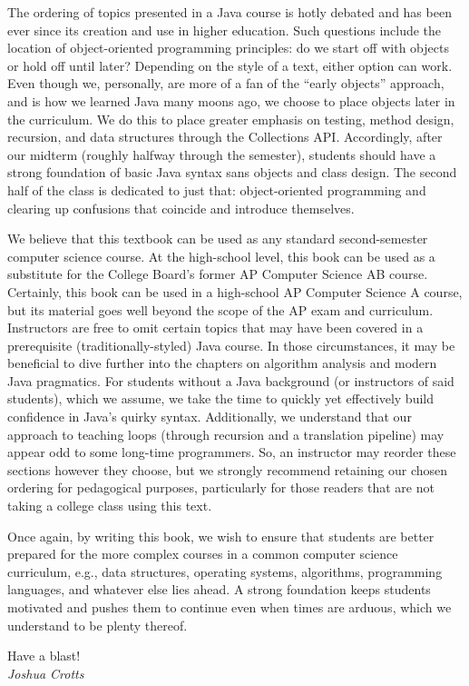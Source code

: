 The ordering of topics presented in a Java course is hotly debated and has been ever since its creation and use in higher education. 
Such questions include the location of object-oriented programming principles: do we start off with objects or hold off until later? 
Depending on the style of a text, either option can work. 
Even though we, personally, are more of a fan of the ``early objects'' approach, and is how we learned Java many moons ago, we choose to place objects later in the curriculum. 
We do this to place greater emphasis on testing, method design, recursion, and data structures through the Collections API. 
Accordingly, after our midterm (roughly halfway through the semester), students should have a strong foundation of basic Java syntax sans objects and class design. 
The second half of the class is dedicated to just that: object-oriented programming and clearing up confusions that coincide and introduce themselves. 

We believe that this textbook can be used as any standard second-semester computer science course. 
At the high-school level, this book can be used as a substitute for the College Board's former AP Computer Science AB course. 
Certainly, this book can be used in a high-school AP Computer Science A course, but its material goes well beyond the scope of the AP exam and curriculum.
Instructors are free to omit certain topics that may have been covered in a prerequisite (traditionally-styled) Java course. 
In those circumstances, it may be beneficial to dive further into the chapters on algorithm analysis and modern Java pragmatics. 
For students without a Java background (or instructors of said students), which we assume, we take the time to quickly yet effectively build confidence in Java's quirky syntax. 
Additionally, we understand that our approach to teaching loops (through recursion and a translation pipeline) may appear odd to some long-time programmers. 
So, an instructor may reorder these sections however they choose, but we strongly recommend retaining our chosen ordering for pedagogical purposes, particularly for those readers that are not taking a college class using this text. 


Once again, by writing this book, we wish to ensure that students are better prepared for the more complex courses in a common computer science curriculum, e.g., data structures, operating systems, algorithms, programming languages, and whatever else lies ahead. 
A strong foundation keeps students motivated and pushes them to continue even when times are arduous, which we understand to be plenty thereof.

\begin{flushright}
Have a blast!\\\emph{Joshua Crotts}
\end{flushright}